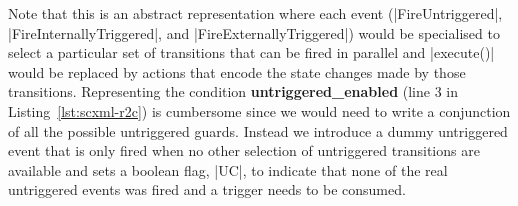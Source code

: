 Note that this is an abstract representation where each event (|FireUntriggered|, |FireInternallyTriggered|, and |FireExternallyTriggered|) would be specialised to select a particular set of transitions that can be fired in parallel and |execute()| would be replaced by actions that encode the state changes made by those transitions.
Representing the condition \textbf{untriggered\_enabled} (line 3 in Listing~\ref{lst:scxml-r2c}) is cumbersome since we would need to write a conjunction of all the possible untriggered guards. Instead we introduce a dummy untriggered event that is only fired when no other selection of untriggered transitions are available and sets a boolean flag, |UC|, to indicate that none of the real untriggered events was fired and a trigger needs to be consumed.

